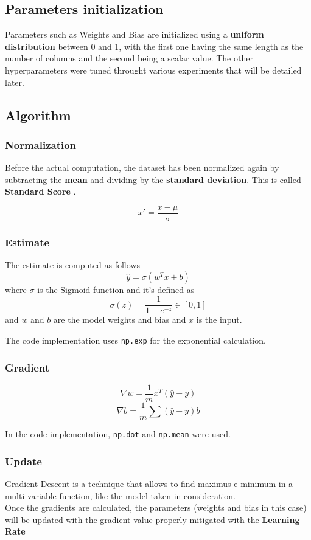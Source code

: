 \documentclass[
	letterpaper, %
	10pt, %
]{class}
\begin{document}
\subsection{Parameters initialization}
Parameters such as Weights and Bias are initialized using a \textbf{uniform distribution} between 0 and 1, with the first one having the same length as the number of columns and the second being a scalar value.
The other hyperparameters were tuned throught various experiments that will be detailed later.

\subsection{Algorithm}

\subsubsection{Normalization}
Before the actual computation, the dataset has been normalized again by subtracting the \textbf{mean} and dividing by the \textbf{standard deviation}. This is called \textbf{Standard Score} \cite{normalization}.

$$ x' = \frac{x - \mu}{\sigma} $$

\subsubsection{Estimate}
The estimate is computed as follows
$$ \hat{y} = \sigma(w^Tx + b) $$
where $\sigma$ is the Sigmoid function \cite{sigmoid} and it's defined as
$$ \sigma(z) = \frac{1}{1 + e^{-z}} \in [0,1] $$
and $w$ and $b$ are the model weights and bias and $x$ is the input.

The code implementation uses \texttt{np.exp} for the exponential calculation.

\subsubsection{Gradient}

$$ \nabla w = \frac{1}{m}x^T(\hat{y} - y) $$
$$ \nabla b = \frac{1}{m}\sum(\hat{y} - y) b $$

In the code implementation, \texttt{np.dot} and \texttt{np.mean} were used.

\subsubsection{Update}

Gradient Descent \cite{sgd} is a technique that allows to find maximus e minimum in a multi-variable function, like the model taken in consideration.\\
Once the gradients are calculated, the parameters (weights and bias in this case) will be updated with the gradient value properly mitigated with the \textbf{Learning Rate}
\end{document}
